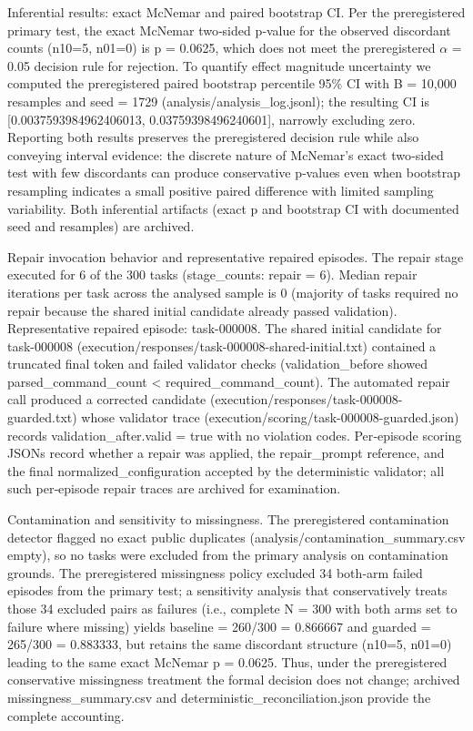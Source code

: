 \documentclass[conference]{IEEEtran}
\begin{document}
Inferential results: exact McNemar and paired bootstrap CI. Per the preregistered primary test, the exact McNemar two‑sided p‑value for the observed discordant counts (n10=5, n01=0) is p = 0.0625, which does not meet the preregistered \ensuremath{\alpha} = 0.05 decision rule for rejection. To quantify effect magnitude uncertainty we computed the preregistered paired bootstrap percentile 95\% CI with B = 10,000 resamples and seed = 1729 (analysis/analysis\_log.jsonl); the resulting CI is [0.0037593984962406013, 0.03759398496240601], narrowly excluding zero. Reporting both results preserves the preregistered decision rule while also conveying interval evidence: the discrete nature of McNemar's exact two‑sided test with few discordants can produce conservative p‑values even when bootstrap resampling indicates a small positive paired difference with limited sampling variability. Both inferential artifacts (exact p and bootstrap CI with documented seed and resamples) are archived.

Repair invocation behavior and representative repaired episodes. The repair stage executed for 6 of the 300 tasks (stage\_counts: repair = 6). Median repair iterations per task across the analysed sample is 0 (majority of tasks required no repair because the shared initial candidate already passed validation). Representative repaired episode: task-000008. The shared initial candidate for task-000008 (execution/responses/task-000008-shared-initial.txt) contained a truncated final token and failed validator checks (validation\_before showed parsed\_command\_count < required\_command\_count). The automated repair call produced a corrected candidate (execution/responses/task-000008-guarded.txt) whose validator trace (execution/scoring/task-000008-guarded.json) records validation\_after.valid = true with no violation codes. Per‑episode scoring JSONs record whether a repair was applied, the repair\_prompt reference, and the final normalized\_configuration accepted by the deterministic validator; all such per‑episode repair traces are archived for examination.

Contamination and sensitivity to missingness. The preregistered contamination detector flagged no exact public duplicates (analysis/contamination\_summary.csv empty), so no tasks were excluded from the primary analysis on contamination grounds. The preregistered missingness policy excluded 34 both‑arm failed episodes from the primary test; a sensitivity analysis that conservatively treats those 34 excluded pairs as failures (i.e., complete N = 300 with both arms set to failure where missing) yields baseline = 260/300 = 0.866667 and guarded = 265/300 = 0.883333, but retains the same discordant structure (n10=5, n01=0) leading to the same exact McNemar p = 0.0625. Thus, under the preregistered conservative missingness treatment the formal decision does not change; archived missingness\_summary.csv and deterministic\_reconciliation.json provide the complete accounting.
\end{document}

